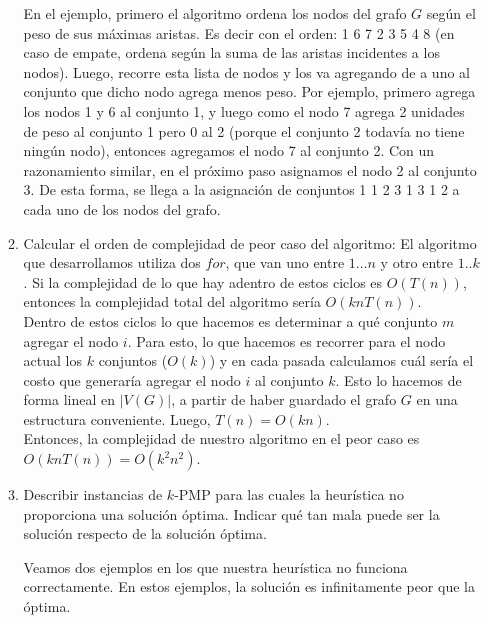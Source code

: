 \documentclass[11pt, a4paper, twoside]{article}
\begin{document}
\begin{enumerate}
\begin{enumerate}
		En el ejemplo, primero el algoritmo ordena los nodos del grafo $G$ según el peso de sus máximas
		aristas. Es decir con el orden: 1 6 7 2 3 5 4 8 (en caso de empate, ordena según la suma de las aristas
		incidentes a los nodos). Luego, recorre esta lista de nodos y los va agregando de a uno al conjunto que
		dicho nodo agrega menos peso. Por ejemplo, primero agrega los nodos 1 y 6 al conjunto 1, y luego como el
		nodo 7 agrega 2 unidades de peso al conjunto 1 pero 0 al 2 (porque el conjunto 2 todavía no tiene ningún
		nodo), entonces agregamos el nodo 7 al conjunto 2. Con un razonamiento similar, en el próximo paso asignamos
		el nodo 2 al conjunto 3. De esta forma, se llega a la asignación de conjuntos 1 1 2 3 1 3 1 2 a cada uno de
		los nodos del grafo.
		
		\item Calcular el orden de complejidad de peor caso del algoritmo:
		El algoritmo que desarrollamos utiliza dos $for$, que van uno entre $1 \dots n$ y otro entre $1..k$.
		Si la complejidad de lo que hay adentro de estos ciclos es $O(T(n))$, entonces la complejidad total
		del algoritmo sería $O(knT(n))$. \\
		Dentro de estos ciclos lo que hacemos es determinar a qué conjunto $m$ agregar el nodo $i$. Para esto,
		lo que hacemos es recorrer para el nodo actual los $k$ conjuntos ($O(k)$) y en cada pasada calculamos 
		cuál sería el costo que generaría agregar el nodo $i$ al conjunto $k$. Esto lo hacemos de forma lineal 
		en $|V(G)|$, a partir de haber guardado el grafo $G$ en una estructura conveniente. Luego, 
		$T(n) = O(kn)$. \\
		Entonces, la complejidad de nuestro algoritmo en el peor caso es $ O(knT(n)) = O(k^2 n^2)$.
		
		\item Describir instancias de $k$-PMP para las cuales la heurística no proporciona una solución
		óptima. Indicar qué tan mala puede ser la solución respecto de la solución óptima.
		
		Veamos dos ejemplos en los que nuestra heurística no funciona correctamente. En estos ejemplos,
		la solución es infinitamente peor que la óptima.
		

\end{enumerate}
\end{enumerate}
\end{document}
